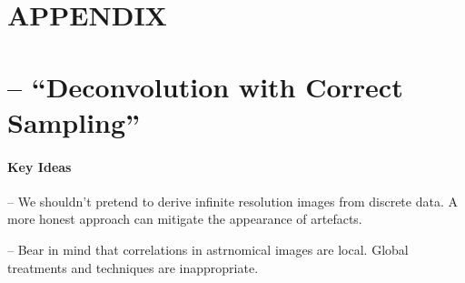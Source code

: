 \documentclass[letterpaper, 11pt]{article}
\def\psfref{\ensuremath{{\rm PSF_{ref}}}\xspace}
\def\ra{\ensuremath{\rightarrow}\xspace}
\begin{document}

\newpage
\appendix
{}
\section*{APPENDIX}

\section{\citet{MCS98} -- ``Deconvolution with Correct Sampling''}
\label{sec:MCS98notes}

\paragraph{Key Ideas}

-- We shouldn't pretend to derive infinite resolution images from discrete data. A more honest approach can mitigate the appearance of 
artefacts.

-- Bear in mind that correlations in astrnomical images are local. Global treatments and techniques are inappropriate.
\end{document}
